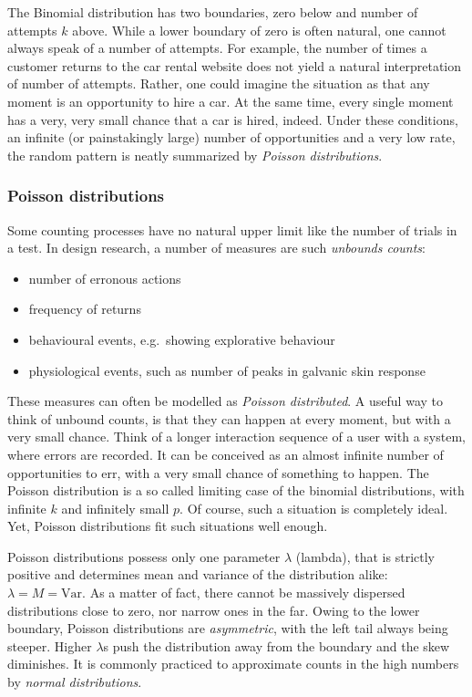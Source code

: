 \documentclass[]{svmono}
\providecommand{\tightlist}{%
  \setlength{\itemsep}{0pt}\setlength{\parskip}{0pt}}
\begin{document}
The Binomial distribution has two boundaries, zero below and number of
attempts \(k\) above. While a lower boundary of zero is often natural,
one cannot always speak of a number of attempts. For example, the number
of times a customer returns to the car rental website does not yield a
natural interpretation of number of attempts. Rather, one could imagine
the situation as that any moment is an opportunity to hire a car. At the
same time, every single moment has a very, very small chance that a car
is hired, indeed. Under these conditions, an infinite (or painstakingly
large) number of opportunities and a very low rate, the random pattern
is neatly summarized by \emph{Poisson distributions}.

\subsubsection{Poisson distributions}\label{poisson_dist}

Some counting processes have no natural upper limit like the number of
trials in a test. In design research, a number of measures are such
\emph{unbounds counts}:

\begin{itemize}
\tightlist
\item
  number of erronous actions
\item
  frequency of returns
\item
  behavioural events, e.g.~showing explorative behaviour
\item
  physiological events, such as number of peaks in galvanic skin
  response
\end{itemize}

These measures can often be modelled as \emph{Poisson distributed}. A
useful way to think of unbound counts, is that they can happen at every
moment, but with a very small chance. Think of a longer interaction
sequence of a user with a system, where errors are recorded. It can be
conceived as an almost infinite number of opportunities to err, with a
very small chance of something to happen. The Poisson distribution is a
so called limiting case of the binomial distributions, with infinite
\(k\) and infinitely small \(p\). Of course, such a situation is
completely ideal. Yet, Poisson distributions fit such situations well
enough.

Poisson distributions possess only one parameter \(\lambda\) (lambda),
that is strictly positive and determines mean and variance of the
distribution alike: \(\lambda = M = \textrm{Var}\). As a matter of fact,
there cannot be massively dispersed distributions close to zero, nor
narrow ones in the far. Owing to the lower boundary, Poisson
distributions are \emph{asymmetric}, with the left tail always being
steeper. Higher \(\lambda\)s push the distribution away from the
boundary and the skew diminishes. It is commonly practiced to
approximate counts in the high numbers by \emph{normal distributions}.
\end{document}
